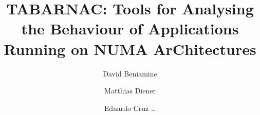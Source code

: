 \documentclass{article}
\author{David Beniamine \and Matthias Diener \and Eduardo Cruz \ldots}
\title{TABARNAC: Tools for Analysing the Behaviour of Applications Running on
NUMA ArChitectures}
\newcommand{\Input}[1]{}
\begin{document}
\graphicspath{ {./img/} }
\maketitle%

\Input{intro.tex}
\Input{motivations.tex}
\Input{stateOfTheArt.tex}
\Input{design.tex}
\Input{experiments.tex}
\Input{conclusions.tex}



\end{document}
